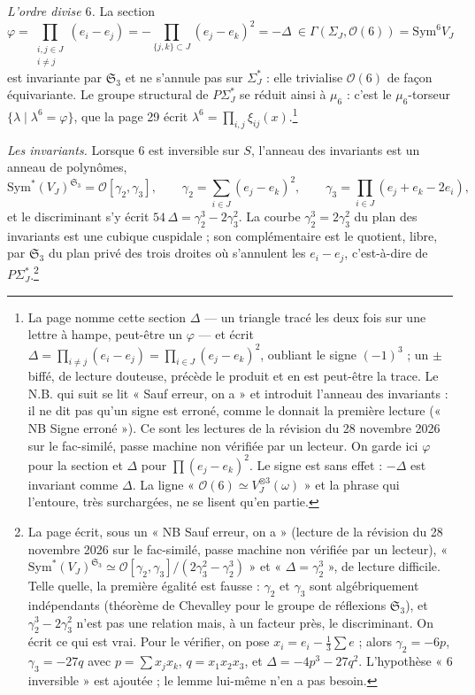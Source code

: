 \documentclass[11pt,a4paper]{article}
\begin{document}
\emph{L'ordre divise $6$.} La section
\[
\varphi = \prod_{\substack{i, j \in J \\ i \neq j}} (e_i - e_j)
= -\prod_{\{j, k\} \subset J} (e_j - e_k)^2 = -\Delta
\ \in \Gamma(\Sigma_J, \mathcal{O}(6)) = \mathrm{Sym}^6 V_J
\]
est invariante par $\mathfrak{S}_3$ et ne s'annule pas sur $\Sigma_J^{*}$ : elle
trivialise $\mathcal{O}(6)$ de façon équivariante. Le groupe structural de
$P\Sigma_J^{*}$ se réduit ainsi à $\mu_6$ : c'est le $\mu_6$-torseur
$\{\lambda \mid \lambda^6 = \varphi\}$, que la page 29 écrit
$\lambda^6 = \prod_{i,j}\xi_{ij}(x)$.\footnote{La page nomme cette section
$\Delta$ — un triangle tracé les deux fois sur une lettre à hampe, peut-être
un $\varphi$ — et écrit $\Delta = \prod_{i \neq j} (e_i - e_j) =
\prod_{i \in J} (e_j - e_k)^2$, oubliant le signe $(-1)^3$ ; un $\pm$ biffé,
de lecture douteuse, précède le produit et en est peut-être la trace. Le N.B.
qui suit se lit « Sauf erreur, on a » et introduit l'anneau des invariants : il
ne dit pas qu'un signe est erroné, comme le donnait la première lecture
(« NB Signe erroné »). Ce sont les lectures de la révision du 28 novembre 2026 sur le fac-similé, passe machine non vérifiée par un lecteur. On garde ici
$\varphi$ pour la section et $\Delta$ pour $\prod (e_j - e_k)^2$. Le signe
est sans effet : $-\Delta$ est invariant comme $\Delta$. La ligne
« $\mathcal{O}(6) \simeq V_J^{\otimes 3}(\omega)$ » et la phrase qui l'entoure,
très surchargées, ne se lisent qu'en partie.}

\emph{Les invariants.} Lorsque $6$ est inversible sur $S$, l'anneau des
invariants est un anneau de polynômes,
\[
\mathrm{Sym}^{*}(V_J)^{\mathfrak{S}_3} = \mathcal{O}[\gamma_2, \gamma_3], \qquad
\gamma_2 = \sum_{i \in J} (e_j - e_k)^2, \qquad
\gamma_3 = \prod_{i \in J} (e_j + e_k - 2e_i) ,
\]
et le discriminant s'y écrit $54\,\Delta = \gamma_2^{3} - 2\gamma_3^{2}$. La courbe
$\gamma_2^3 = 2\gamma_3^2$ du plan des invariants est une cubique cuspidale ; son
complémentaire est le quotient, libre, par $\mathfrak{S}_3$ du plan privé des
trois droites où s'annulent les $e_i - e_j$, c'est-à-dire de $P\Sigma_J^{*}$.\footnote{La page écrit,
sous un « NB Sauf erreur, on a » (lecture de la révision du 28 novembre 2026 sur le fac-similé, passe machine non vérifiée par un lecteur),
« $\mathrm{Sym}^{*}(V_J)^{\mathfrak{S}_3} \simeq
\mathcal{O}[\gamma_2, \gamma_3]/(2\gamma_3^2 - \gamma_2^3)$ » et
« $\Delta = \gamma_2^3$ », de lecture difficile. Telle quelle, la première
égalité est fausse : $\gamma_2$ et $\gamma_3$ sont algébriquement indépendants
(théorème de Chevalley pour le groupe de réflexions $\mathfrak{S}_3$), et
$\gamma_2^3 - 2\gamma_3^2$ n'est pas une relation mais, à un facteur près, le
discriminant. On écrit ce qui est vrai. Pour le vérifier, on pose
$x_i = e_i - \frac13\sum e$ ; alors $\gamma_2 = -6p$, $\gamma_3 = -27q$ avec
$p = \sum x_jx_k$, $q = x_1x_2x_3$, et $\Delta = -4p^3 - 27q^2$. L'hypothèse
« $6$ inversible » est ajoutée ; le lemme lui-même n'en a pas besoin.}
\end{document}
